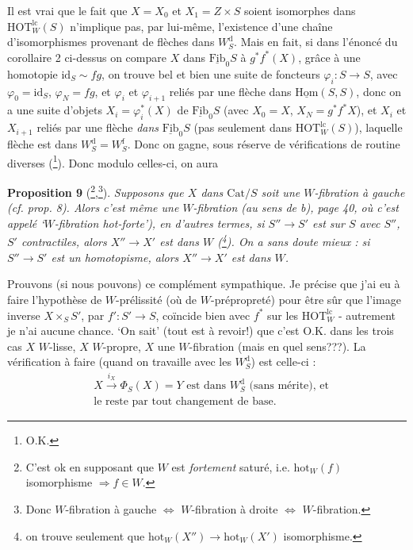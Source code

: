 \documentclass[11pt]{article}
\newcommand{\msp}[1]{\marginpar{\footnotesize [#1]}}
\newcommand{\HOTlc}{\mathrm{HOT}^{\mathrm{lc}}_W}
\newcommand{\hot}{\mathrm{hot}}
\newcommand{\id}{\mathrm{id}}
\newcommand{\Wd}{W^{\mathrm{d}}_S}
\newcommand{\Wf}{W^{\mathrm{f}}_S}
\begin{document}
Il est vrai que le fait que $X = X_0$ et $X_1 = Z \times S$ soient isomorphes dans $\HOTlc(S)$ n'implique pas, par lui-même, l'existence d'une \msp{page 48} chaîne d'isomorphismes provenant de flèches dans $\Wd$. Mais en fait, si dans l'énoncé du corollaire 2 ci-dessus on compare $X$ dans $\underline{\mathrm{Fib}}_0S$ à $g^*f^*(X)$, grâce à une homotopie $\id_S \sim fg$, on trouve bel et bien une suite de foncteurs $\varphi_i : S \longrightarrow S$, avec $\varphi_0 = \id_S$, $\varphi_N = fg$, et $\varphi_i$ et $\varphi_{i+1}$ reliés par une flèche dans $\underline{\mathrm{Hom}}(S,S)$, donc on a une suite d'objets $X_i = \varphi_i^*(X)$ de $\underline{\mathrm{Fib}}_0S$ (avec $X_0 = X$, $X_N = g^*f^*X$), et $X_i$ et $X_{i+1}$ reliés par une flèche \textit{dans} $\underline{\mathrm{Fib}}_0S$ (pas seulement dans $\HOTlc(S)$), laquelle flèche est dans $\Wd = \Wf$. Donc on gagne, sous réserve de vérifications de routine diverses (\footnote[55]{O.K.}). Donc modulo celles-ci, on aura

\textbf{Proposition 9} (\footnote[56]{C'est ok en supposant que $W$ est \textit{fortement} saturé, i.e. $\hot_W(f)$ isomorphisme $\Longrightarrow f \in W$.},\footnote[57]{Donc $W$-fibration à gauche $\Longleftrightarrow$ $W$-fibration à droite $\Longleftrightarrow$ $W$-fibration.}). \textit{Supposons que $X$ dans $\mathrm{Cat}/S$ soit une $W$-fibration à gauche (cf. prop. 8). Alors c'est même une $W$-fibration (au sens de b), page 40, où c'est appelé `$W$-fibration \textup{hot}-forte'), en d'autres termes, si $S'' \longrightarrow S'$ est sur $S$ avec $S''$, $S'$ contractiles, alors $X'' \longrightarrow X'$ est dans $W$ (\footnote[58]{on trouve seulement que $\hot_W(X'') \longrightarrow \hot_W(X')$ isomorphisme.}). On a sans doute mieux : si $S'' \longrightarrow S'$ est un homotopisme, alors $X'' \longrightarrow X'$ est dans $W$.}

\msp{page 49}
Prouvons (si nous pouvons) ce complément sympathique. Je précise que j'ai eu à faire l'hypothèse de $W$-prélissité (où de $W$-prépropreté) pour être sûr que l'image inverse $X \times_S S'$, par $f' : S' \longrightarrow S$, coïncide bien avec $f^*$ sur les $\HOTlc$ - autrement je n'ai aucune chance. %
`On sait' (tout est à revoir!) que c'est O.K. dans les trois cas $X$ $W$-lisse, $X$ $W$-propre, $X$ une $W$-fibration (mais en quel sens???). La vérification à faire (quand on travaille avec les $\Wd$) est celle-ci :
\[ \begin{aligned}
&X \xrightarrow{i_X} \Phi_S(X) = Y \text{ est dans } \Wd \text{ (sans mérite), et} \\
&\text{le reste par tout changement de base.}
\end{aligned} \tag*{$(*)$} \]
\end{document}
